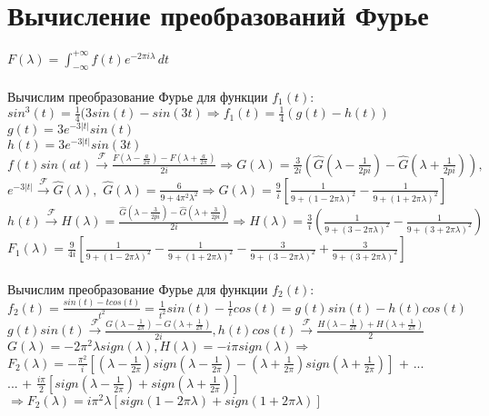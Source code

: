 
\section{Вычисление преобразований Фурье}
$F(\lambda) = \int_{-\infty}^{+\infty} \! f(t)e^{-2 \pi i \lambda} \,dt $\\ \\
Вычислим преобразование Фурье для функции $ f_1(t) $: \\
$ sin^3(t) = \frac{1}{4}(3sin(t) - sin(3t) \Rightarrow f_1(t) = \frac{1}{4}(g(t)-h(t))$ \\
$ g(t) = 3e^{-3|t|}sin(t)$ \\
$ h(t) = 3e^{-3|t|}sin(3t) $ \\
$ f(t)sin(at) \xrightarrow{\mathscr{F}} \frac{F(\lambda - \frac{a}{2\pi}) - F(\lambda + \frac{a}{2\pi})}{2i} \Rightarrow G(\lambda) = \frac{3}{2i}(\widehat{G}(\lambda - \frac{1}{2pi}) - \widehat{G}(\lambda + \frac{1}{2pi})),$ \\ 
 $e^{-3|t|} \xrightarrow{\mathscr{F}} \widehat{G}(\lambda), $
$ \widehat{G}(\lambda) = \frac{6}{9+4 \pi^2 \lambda^2} \Rightarrow G(\lambda) = \frac{9}{i}\left[ \frac{1}{9+(1 - 2\pi \lambda)^2} - \frac{1}{9+(1 + 2\pi \lambda)^2} \right] $ \\
$ h(t) \xrightarrow{\mathscr{F}} H(\lambda) = \frac{\widehat{G}(\lambda - \frac{3}{2pi}) - \widehat{G}(\lambda + \frac{3}{2pi})}{2i} \Rightarrow H(\lambda) = \frac{3}{i}(\frac{1}{9+(3 - 2\pi \lambda)^2} - \frac{1}{9+(3 + 2\pi \lambda)^2}) $  \\
$ F_1(\lambda) = \frac{9}{4i} \left[ \frac{1}{9+(1 - 2\pi \lambda)^2} - \frac{1}{9+(1 + 2\pi \lambda)^2} - \frac{3}{9+(3 - 2\pi \lambda)^2} + \frac{3}{9+(3 + 2\pi \lambda)^2} \right] $ \\ \\
Вычислим преобразование Фурье для функции $ f_2(t) $: \\
$ f_2(t) = \frac{sin(t)-tcos(t)}{t^2} = \frac{1}{t^2}sin(t) - \frac{1}{t}cos(t) = g(t)sin(t) - h(t)cos(t)$ \\
$ g(t)sin(t) \xrightarrow{\mathscr{F}} \frac{G(\lambda - \frac{1}{2 \pi}) - G(\lambda + \frac{1}{2 \pi})}{2i}, h(t)cos(t) \xrightarrow{\mathscr{F}} \frac{H(\lambda - \frac{1}{2 \pi}) + H(\lambda + \frac{1}{2 \pi})}{2}$ \\
$ G(\lambda) = -2 \pi^2 \lambda sign(\lambda), H(\lambda) = -i \pi sign(\lambda) \Rightarrow$ \\
$ F_2(\lambda) = -\frac{\pi^2}{i} \left[ (\lambda - \frac{1}{2 \pi})sign(\lambda - \frac{1}{2 \pi}) - (\lambda + \frac{1}{2 \pi})sign(\lambda + \frac{1}{2 \pi})\right]$ + ... \\ 
... + $ \frac{i \pi}{2} \left[ sign(\lambda - \frac{1}{2 \pi}) + sign(\lambda + \frac{1}{2 \pi}) \right]$ \\
$ \Rightarrow F_2(\lambda) = i \pi^2 \lambda \left[ sign(1 - 2 \pi \lambda) + sign(1 + 2 \pi \lambda)\right]$


